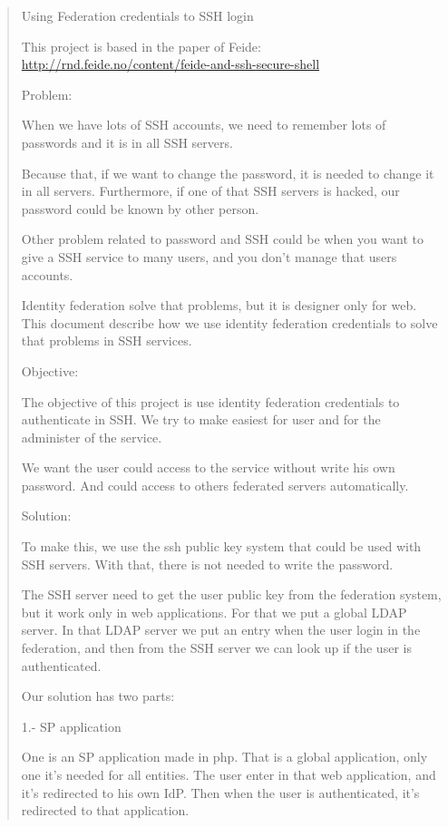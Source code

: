 \begin{quote}

Using Federation credentials to SSH login

This project is based in the paper of Feide:
\url{http://rnd.feide.no/content/feide-and-ssh-secure-shell}

Problem:

    When we have lots of SSH accounts, we need to remember lots of
    passwords and it is in all SSH servers.

    Because that, if we want to change the password, it is needed to
    change it in all servers.  Furthermore, if one of that SSH servers
    is hacked, our password could be known by other person.

    Other problem related to password and SSH could be when you want
    to give a SSH service to many users, and you don't manage that
    users accounts. 

    Identity federation solve that problems, but it is designer only
    for web. This document describe how we use identity federation
    credentials to solve that problems in SSH services.

Objective:

    The objective of this project is use identity federation
    credentials to authenticate in SSH. We try to make easiest for
    user and for the administer of the service.

    We want the user could access to the service without write his own
    password. And could access to others federated servers
    automatically.

Solution:

    To make this, we use the ssh public key system that could be used
    with SSH servers. With that, there is not needed to write the
    password.

    The SSH server need to get the user public key from the federation
    system, but it work only in web applications. For that we put a
    global LDAP server. In that LDAP server we put an entry when the
    user login in the federation, and then from the SSH server we can
    look up if the user is authenticated.

    Our solution has two parts:
    
    1.- SP application

    One is an SP application made in php.  That is a global
    application, only one it's needed for all entities. The user enter
    in that web application, and it's redirected to his own IdP. Then
    when the user is authenticated, it's redirected to that
    application.


\end{quote}
